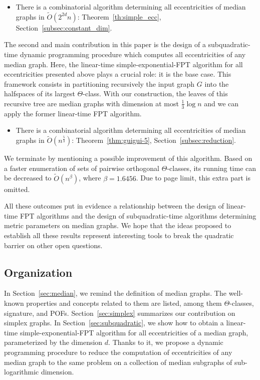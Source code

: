 \documentclass[a4paper,UKenglish,numberwithinsect,cleveref, autoref]{lipics-v2021}
\begin{document}
\begin{itemize}
\item There is a combinatorial algorithm determining all eccentricities of median graphs in $\tilde{O}(2^{2d}n)$: Theorem~\ref{th:simple_ecc}, Section~\ref{subsec:constant_dim}.
\end{itemize}

The second and main contribution in this paper is the design of a subquadratic-time dynamic programming procedure which computes all eccentricities of any median graph. Here, the linear-time simple-exponential-FPT algorithm for all eccentricities presented above plays a crucial role: it is the base case. This framework consists in partitioning recursively the input graph $G$ into the halfspaces of its largest $\Theta$-class. With our construction, the leaves of this recursive tree are median graphs with dimension at most $\frac{1}{3}\log n$ and we can apply the former linear-time FPT algorithm.

\begin{itemize}
    \item There is a combinatorial algorithm determining all eccentricities of median graphs in $\tilde{O}(n^{\frac{5}{3}})$: Theorem~\ref{thm:guigui-5}, Section~\ref{subsec:reduction}.
\end{itemize}

We terminate by mentioning a possible improvement of this algorithm. Based on a faster enumeration of sets of pairwise orthogonal $\Theta$-classes, its running time can be decreased to $\tilde{O}(n^{\beta})$, where $\beta = 1.6456$. Due to page limit, this extra part is omitted.

All these outcomes put in evidence a relationship between the design of linear-time FPT algorithms and the design of subquadratic-time algorithms determining metric parameters on median graphs. We hope that the ideas proposed to establish all these results represent interesting tools to break the quadratic barrier on other open questions.

\subsection{Organization}

In Section~\ref{sec:median}, we remind the definition of median graphs. The well-known properties and concepts related to them are listed, among them $\Theta$-classes, signature, and POFs. Section~\ref{sec:simplex} summarizes our contribution on simplex graphs. In Section~\ref{sec:subquadratic}, we show how to obtain a linear-time simple-exponential-FPT algorithm for all eccentricities of a median graph, parameterized by the dimension $d$. Thanks to it, we propose a dynamic programming procedure to reduce the computation of eccentricities of any median graph to the same problem on a collection of median subgraphs of sub-logarithmic dimension. 
\end{document}
